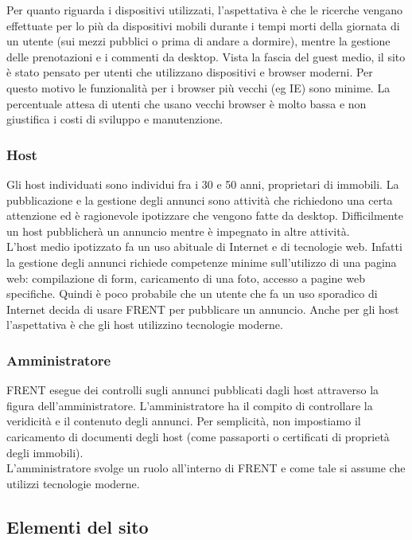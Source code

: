 \documentclass[1_relazione.tex]{subfiles}
\begin{document}
Per quanto riguarda i dispositivi utilizzati, l'aspettativa è che le ricerche vengano effettuate per lo più da dispositivi mobili durante i tempi morti della giornata di un utente (sui mezzi pubblici o prima di andare a dormire), mentre la gestione delle prenotazioni e i commenti da desktop. 
Vista la fascia del guest medio, il sito è stato pensato per utenti che utilizzano dispositivi e browser moderni. 
Per questo motivo le funzionalità per i browser più vecchi (eg IE) sono minime. La percentuale attesa di utenti che usano vecchi browser è molto bassa e non giustifica i costi di sviluppo e manutenzione.

\subsubsection{Host}
Gli host individuati sono individui fra i 30 e 50 anni, proprietari di immobili. La pubblicazione e la gestione degli annunci sono attività che richiedono una certa attenzione ed è ragionevole ipotizzare che vengono fatte da desktop. Difficilmente un host pubblicherà un annuncio mentre è impegnato in altre attività. \\
L'host medio ipotizzato fa un uso abituale di Internet e di tecnologie web. Infatti la gestione degli annunci richiede competenze minime sull'utilizzo di una pagina web: compilazione di form, caricamento di una foto, accesso a pagine web specifiche. Quindi è poco probabile che un utente che fa un uso sporadico di Internet decida di usare FRENT per pubblicare un annuncio.
Anche per gli host l'aspettativa è che gli host utilizzino tecnologie moderne.


\subsubsection{Amministratore}
FRENT esegue dei controlli sugli annunci pubblicati dagli host attraverso la figura dell'amministratore. L'amministratore ha il compito di controllare la veridicità e il contenuto degli annunci.  Per semplicità, non impostiamo il caricamento di documenti degli host (come passaporti o certificati di proprietà degli immobili). \\
L'amministratore svolge un ruolo all'interno di FRENT e come tale si assume che utilizzi tecnologie moderne.   

\subsection{Elementi del sito}
\end{document}
